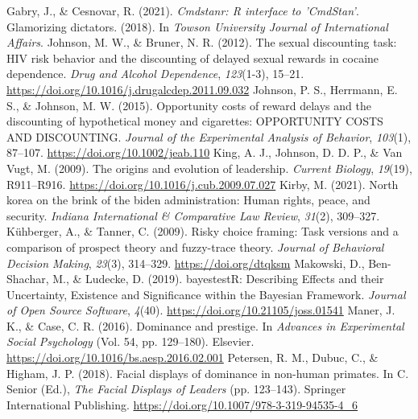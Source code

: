 \documentclass[
  donotrepeattitle,doc, 12pt, a4paper,floatsintext]{apa7}
\newlength{\cslhangindent}
\newlength{\cslentryspacingunit} %
\newenvironment{CSLReferences}[2] %
 {%
  \setlength{\parindent}{0pt}
  \ifodd #1
  \let\oldpar\par
  \def\par{\hangindent=\cslhangindent\oldpar}
  \fi
  \setlength{\parskip}{#2\cslentryspacingunit}
 }%
 {}
\begin{document}
\begin{CSLReferences}{1}{0}
Gabry, J., \& Cesnovar, R. (2021). \emph{Cmdstanr: {R} interface to '{CmdStan}'}.
\leavevmode{}%
Glamorizing dictators. (2018). In \emph{Towson University Journal of International Affairs}.
\leavevmode{}%
Johnson, M. W., \& Bruner, N. R. (2012). The sexual discounting task: {HIV} risk behavior and the discounting of delayed sexual rewards in cocaine dependence. \emph{Drug and Alcohol Dependence}, \emph{123}(1-3), 15--21. \url{https://doi.org/10.1016/j.drugalcdep.2011.09.032}
\leavevmode{}%
Johnson, P. S., Herrmann, E. S., \& Johnson, M. W. (2015). Opportunity costs of reward delays and the discounting of hypothetical money and cigarettes: {OPPORTUNITY COSTS AND DISCOUNTING}. \emph{Journal of the Experimental Analysis of Behavior}, \emph{103}(1), 87--107. \url{https://doi.org/10.1002/jeab.110}
\leavevmode{}%
King, A. J., Johnson, D. D. P., \& Van Vugt, M. (2009). The origins and evolution of leadership. \emph{Current Biology}, \emph{19}(19), R911--R916. \url{https://doi.org/10.1016/j.cub.2009.07.027}
\leavevmode{}%
Kirby, M. (2021). North korea on the brink of the biden administration: Human rights, peace, and security. \emph{Indiana International \& Comparative Law Review}, \emph{31}(2), 309--327.
\leavevmode{}%
Kühberger, A., \& Tanner, C. (2009). Risky choice framing: Task versions and a comparison of prospect theory and fuzzy-trace theory. \emph{Journal of Behavioral Decision Making}, \emph{23}(3), 314--329. \url{https://doi.org/dtqksm}
\leavevmode{}%
Makowski, D., Ben-Shachar, M., \& Ludecke, D. (2019). {bayestestR}: {Describing Effects} and their {Uncertainty}, {Existence} and {Significance} within the {Bayesian Framework}. \emph{Journal of Open Source Software}, \emph{4}(40). \url{https://doi.org/10.21105/joss.01541}
\leavevmode{}%
Maner, J. K., \& Case, C. R. (2016). Dominance and prestige. In \emph{Advances in {Experimental Social Psychology}} (Vol. 54, pp. 129--180). {Elsevier}. \url{https://doi.org/10.1016/bs.aesp.2016.02.001}
\leavevmode{}%
Petersen, R. M., Dubuc, C., \& Higham, J. P. (2018). Facial displays of dominance in non-human primates. In C. Senior (Ed.), \emph{The {Facial Displays} of {Leaders}} (pp. 123--143). {Springer International Publishing}. \url{https://doi.org/10.1007/978-3-319-94535-4_6}

\end{CSLReferences}
\end{document}
